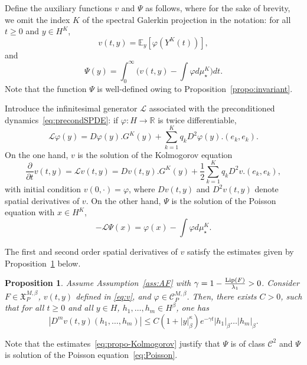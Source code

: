\documentclass[11pt]{amsart}
\newcommand{\E}{\mathbb{E}}
\newcommand{\R}{\mathbb{R}}
\newtheorem{propo}[theo]{Proposition}
\begin{document}
Define the auxiliary functions $v$ and $\Psi$ as follows, where for the sake of brevity, we omit the index $K$ of the spectral Galerkin projection in the notation: for all $t\ge 0$ and $y\in H^K$,
\begin{equation}\label{eq:v}
v(t,y)=\E_y[\varphi(Y^K(t))],
\end{equation}
and
\begin{equation} \label{eq:defPsi}
\Psi(y)=\int_{0}^{\infty}\bigl(v(t,y)-\int\varphi d\mu_\star^K\bigr)dt.
\end{equation}
Note that the function $\Psi$ is well-defined owing to Proposition~\ref{propo:invariant}.

Introduce the infinitesimal generator $\mathcal{L}$ associated with the preconditioned dynamics~\eqref{eq:precondSPDE}: if $\varphi:H\to\R$ is twice differentiable,
\[
\mathcal{L}\varphi(y)=D\varphi(y).G^K(y)
+\sum_{k=1}^K q_kD^2\varphi(y).(e_k,e_k).
\]
On the one hand, $v$ is the solution of the Kolmogorov equation
\begin{equation}\label{eq:Kolmogorov}
\frac{\partial}{\partial t}v(t,y)=\mathcal{L}v(t,y)= 
Dv(t,y).G^K(y)+\frac12 \sum_{k=1}^K q_kD^2v.(e_k,e_k),
\end{equation}
with initial condition $v(0,\cdot)=\varphi$, where $Dv(t,y)$ and $D^2v(t,y)$ denote spatial derivatives of $v$.
%
On the other hand, $\Psi$ is the solution of the Poisson equation with $x\in H^K$,
\begin{equation}\label{eq:Poisson}
-\mathcal{L}\Psi(x)=\varphi(x)-\int\varphi d\mu_\star^K.
\end{equation}



The first and second order spatial derivatives of $v$ satisfy the estimates given by Proposition~\ref{propo:Kolmogorov} below.
\begin{propo}\label{propo:Kolmogorov}
Assume Assumption~\ref{ass:AF} with $\gamma=1-\frac{{\rm Lip}(F)}{\lambda_1}>0$. Consider $F\in \mathfrak{X}^{M,\beta}_P$, $v(t,y)$ defined in \eqref{eq:v}, and $\varphi\in \mathcal{C}^{M,\beta}_P$.
Then, there exists $C>0$, such that for all $t\ge 0$ and all $y\in H$, $h_1,\dots,h_m\in H^\beta$, one has
\begin{equation}\label{eq:propo-Kolmogorov}
|D^m v(t,y)(h_1,\dots,h_m)|\leq C (1+|y|_\beta^\kappa) e^{-\gamma t}|h_1|_\beta\dots |h_m|_\beta.
\end{equation}
\end{propo}

Note that the estimates~\eqref{eq:propo-Kolmogorov} justify that $\Psi$ is of class $\mathcal{C}^2$ and $\Psi$ is solution of the Poisson equation~\eqref{eq:Poisson}.
\end{document}

